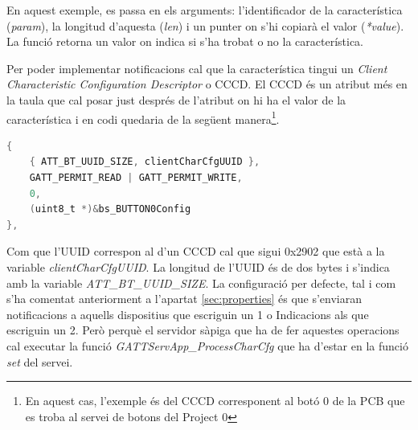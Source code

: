 En aquest exemple, es passa en els arguments: l'identificador de la característica (\textit{param}), la longitud d'aquesta (\textit{len}) i un punter on s'hi copiarà el valor (\textit{*value}).
La funció retorna un valor on indica si s'ha trobat o no la característica.

Per poder implementar notificacions cal que la característica tingui un \textit{Client Characteristic Configuration Descriptor} o CCCD.
El CCCD és un atribut més en la taula que cal posar just després de l'atribut on hi ha el valor de la característica i en codi quedaria de la següent manera\footnote{En aquest cas, l'exemple és del CCCD corresponent al botó 0 de la PCB que es troba al servei de botons del Project 0}.

\begin{lstlisting}[language=C]
{
	{ ATT_BT_UUID_SIZE, clientCharCfgUUID },
	GATT_PERMIT_READ | GATT_PERMIT_WRITE,
	0,
	(uint8_t *)&bs_BUTTON0Config
},
\end{lstlisting}

Com que l'UUID correspon al d'un CCCD cal que sigui 0x2902 que està a la variable \textit{clientCharCfgUUID}.
La longitud de l'UUID és de dos bytes i s'indica amb la variable \textit{ATT\_BT\_UUID\_SIZE}.
La configuració per defecte, tal i com s'ha comentat anteriorment a l'apartat \ref{sec:properties} és que s'enviaran notificacions a aquells dispositius que escriguin un 1 o Indicacions als que escriguin un 2.
Però perquè el servidor sàpiga que ha de fer aquestes operacions cal executar la funció \textit{GATTServApp\_ProcessCharCfg} que ha d'estar en la funció \textit{set} del servei.









